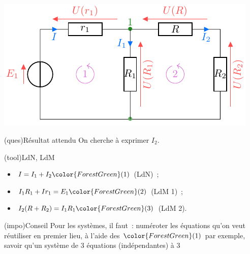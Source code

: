 \documentclass[../../main/main.tex]{subfiles}
\begin{document}
{\begin{tcbraster}[raster columns=5, raster equal height=rows]
\begin{tcb}[raster multicolumn=3]
        \subsection{}
        \begin{center}
            \includegraphics{calc_intens}
        \end{center}
    \end{tcb}
    \begin{tcolorbox}[blankest, raster multicolumn=2, space to=\myspace]
        \begin{tcbraster}[raster columns=1]
            \begin{tcb}[add to natural height=\myspace](ques){Résultat attendu}
                On cherche à exprimer $I_2$.
            \end{tcb}
            \begin{tcb}(tool){{LdN, LdM}}
                \begin{itemize}
                    \item $I = I_1 + I_2 \color{ForestGreen}(1)$ (LdN)~;
                    \item $I_1R_1 + Ir_1 = E_1 \color{ForestGreen}(2)$ (LdM 1)~;
                    \item $I_2(R+R_2) = I_1R_1 \color{ForestGreen}(3)$ (LdM 2).
                \end{itemize}
            \end{tcb}
        \end{tcbraster}
    \end{tcolorbox}
\end{tcbraster}
\begin{tcbraster}[raster columns=2, raster equal height=rows]
    \begin{tcb}(impo){Conseil}
        Pour les systèmes, il faut~: numéroter les équations qu'on veut
        réutiliser en premier lieu, à l'aide des $\color{ForestGreen}(1)$ par
        exemple, savoir qu'un système de 3 équations (indépendantes) à 3

\end{tcb}
\end{tcbraster}}
\end{document}

